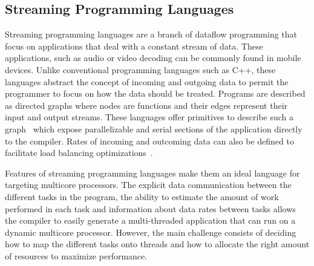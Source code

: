 \vspace{10mm}
\subsection{Streaming Programming Languages}


Streaming programming languages are a branch of dataflow programming that focus on applications that deal with a constant stream of data.
These applications, such as audio or video decoding can be commonly found in mobile devices.
Unlike conventional programming languages such as C++, these languages abstract the concept of incoming and outgoing data to permit the programmer to focus on how the data should be treated.
Programs are described as directed graphs where nodes are functions and their edges represent their input and output streams. 
These languages offer primitives to describe such a graph~\cite{theis2002streamit} which expose parallelizable and serial sections of the application directly to the compiler. 
Rates of incoming and outcoming data can also be defined to facilitate load balancing optimizations~\cite{chen2005rawstream}.

Features of streaming programming languages make them an ideal language for targeting multicore processors.
The explicit data communication between the different tasks in the program, the ability to estimate the amount of work performed in each task and information about data rates between tasks allows the compiler to easily generate a multi-threaded application that can run on a dynamic multicore processor.
However, the main challenge consists of deciding how to map the different tasks onto threads and how to allocate the right amount of resources to maximize performance.

